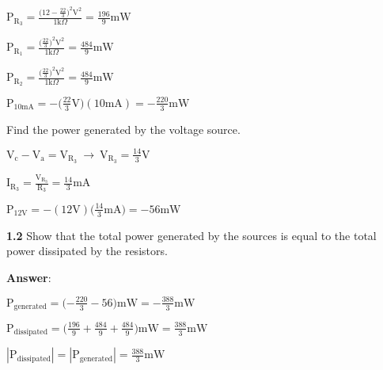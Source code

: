 \documentclass{article}
\begin{document}
\vspace{4mm}

{$\displaystyle \boxed{\text{P}_{\text{R}_3} = \frac{\Big(\displaystyle12-\frac{22}{3}\Big)^2 \text{V}^2}{1 \text{k} \Omega} = \frac{196}{9}\text{mW}}$}

\vspace{4mm}

{$\displaystyle \boxed{\text{P}_{\text{R}_1} = \frac{\Big(\displaystyle\frac{22}{3}\Big)^2 \text{V}^2}{1 \text{k} \Omega} = \frac{484}{9}\text{mW}}$}

\vspace{4mm}

{$\displaystyle \boxed{\text{P}_{\text{R}_2} = \frac{\Big(\displaystyle\frac{22}{3}\Big)^2 \text{V}^2}{1 \text{k} \Omega} = \frac{484}{9}\text{mW}}$}

\vspace{4mm}

{$\displaystyle \boxed{\text{P}_{10\text{mA}} = -\Big(\frac{22}{3}\text{V}\Big)(10\text{mA}) = -\frac{220}{3}\text{mW}}$}

\vspace{8mm}

{Find the power generated by the voltage source.}

\vspace{4mm}

{$\displaystyle \text{V}_{\text{c}} - \text{V}_\text{a} = \text{V}_{\text{R}_3} \ \rightarrow \ \text{V}_{\text{R}_3} = \frac{14}{3}\text{V}$}

\vspace{4mm}

{$\displaystyle \text{I}_{\text{R}_3} = \frac{\text{V}_{\text{R}_3}}{\text{R}_3} = \frac{14}{3}\text{mA}$}

\vspace{4mm}

{$\displaystyle \boxed{\text{P}_{12\text{V}} = -(12\text{V})\Big(\frac{14}{3}\text{mA}\Big) = -56\text{mW}}$}

\vspace{8mm}

{\textbf{1.2} Show that the total power generated by the sources is equal to the total power 
dissipated by the resistors.}

\vspace{4mm}

{\textbf{Answer}:}

\vspace{4mm}

{$\displaystyle \text{P}_\text{generated} = \Big({-\frac{220}{3}}- 56\Big)\text{mW} = -\frac{388}{3}\text{mW}$}

\vspace{4mm}

{$\displaystyle \text{P}_\text{dissipated} = \Big({\frac{196}{9}} + \frac{484}{9}+ \frac{484}{9}\Big)\text{mW} = \frac{388}{3}\text{mW}$}

\vspace{4mm}

{$\displaystyle \boxed{|\text{P}_\text{dissipated}| = |\text{P}_\text{generated}| = \frac{388}{3}\text{mW}}$}

\vspace{8mm}
\end{document}
